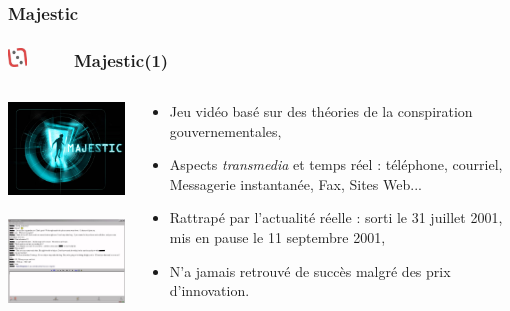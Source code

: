 \documentclass[slidetop,11pt]{beamer}
\def\sectionPartIIaV{Majestic}
\def\moreInFrameTitleLeftt{\includegraphics[height=0.5cm]{img/ligueludique-0.png}~~~~~}
\begin{document}
\subsubsection{\sectionPartIIaV} %
\begin{frame}
	\frametitle{\moreInFrameTitleLeftt \sectionPartIIaV (1) }
	
	\begin{columns}[T]
		\begin{column}[T]{5.05cm}
			\includegraphics[width=5.00cm]{img/majesticARGgame/majestic-screenshot-ME0000034566_2.jpg}~\\
			\includegraphics[width=5.00cm]{img/majesticARGgame/ca-a-bien-change-teens-irc-net-ME0000034567_2.jpg}~\\
		\end{column}
		\begin{column}[T]{5.05cm}
			\begin{itemize}
				\item Jeu vid{\'e}o bas{\'e} sur des th{\'e}ories de la conspiration gouvernementales, 
				\item Aspects \emph{transmedia} et temps r{\'e}el : t{\'e}l{\'e}phone, courriel, Messagerie instantan{\'e}e, Fax, Sites Web...
				\item Rattrap{\'e} par l'actualit{\'e} r{\'e}elle : sorti le 31 juillet 2001, mis en pause le 11 septembre 2001, 
				\item N'a jamais retrouv{\'e} de succ{\`e}s malgr{\'e} des prix d'innovation. 
			\end{itemize}
		\end{column}
	\end{columns}
\end{frame} 
\end{document}
